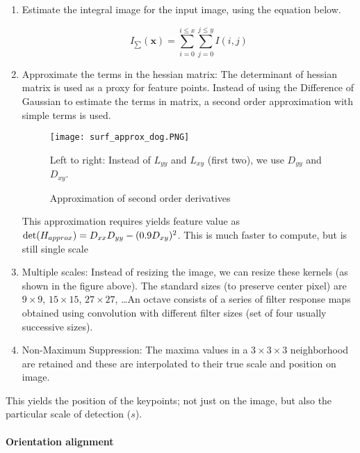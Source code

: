 \begin{enumerate}
    \item Estimate the integral image for the input image, using the equation below.

        \begin{equation*}
            I_{\sum}(\mathbf{x}) = \sum_{i=0}^{i \leq x} \sum_{j=0}^{j \leq y} I(i, j)
        \end{equation*}
    
    \item Approximate the terms in the hessian matrix: The determinant of hessian matrix is used as a proxy for feature points.
    Instead of using the Difference of Gaussian to estimate the terms in matrix, a second order approximation with simple terms is used.
    
        \begin{figure*}[h]
            \centering
            \texttt{[image: surf\_approx\_dog.PNG]}
            \caption{Approximation of second order derivatives}
            \small
                Left to right: Instead of $L_{yy}$ and $L_{xy}$ (first two), we use $D_{yy}$ and $D_{xy}$.
        \end{figure*}
    
    This approximation requires yields feature value as $\textup{det}(H_{approx}) = D_{xx} D_{yy} - (0.9 D_{xy})^2$. This is much faster to compute, but is still single scale

    \item Multiple scales: Instead of resizing the image, we can resize these kernels (as shown in the figure above). The standard sizes (to preserve center pixel) are $9\times 9$, $15\times 15$, $27\times 27$, \dots An octave consists of a series of filter response maps obtained using convolution with different filter sizes (set of four usually successive sizes).
    
    \item Non-Maximum Suppression: The maxima values in a $3\times 3\times 3$ neighborhood are retained and these are interpolated to their true scale and position on image.
\end{enumerate}

This yields the position of the keypoints; not just on the image, but also the particular scale of detection ($s$).

\paragraph*{Orientation alignment}

